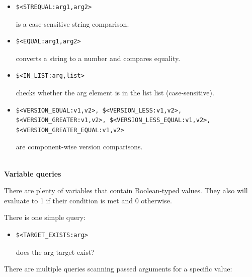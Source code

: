 \begin{itemize}
\item 
\begin{lstlisting}[style=styleCMake]
$<STREQUAL:arg1,arg2> 
\end{lstlisting}

is a case-sensitive string comparison.

\item 
\begin{lstlisting}[style=styleCMake]
$<EQUAL:arg1,arg2> 
\end{lstlisting}

converts a string to a number and compares equality.

\item 
\begin{lstlisting}[style=styleCMake]
$<IN_LIST:arg,list> 
\end{lstlisting}

checks whether the arg element is in the list list (case-sensitive).

\item 
\begin{lstlisting}[style=styleCMake]
$<VERSION_EQUAL:v1,v2>, $<VERSION_LESS:v1,v2>,
$<VERSION_GREATER:v1,v2>, $<VERSION_LESS_EQUAL:v1,v2>,
$<VERSION_GREATER_EQUAL:v1,v2> 
\end{lstlisting}
are component-wise version comparisons.
\end{itemize}

\hspace*{\fill} \\ %
\noindent
\textbf{Variable queries}

There are plenty of variables that contain Boolean-typed values. They also will evaluate to 1 if their condition is met and 0 otherwise.

There is one simple query:

\begin{itemize}
\item 
\begin{lstlisting}[style=styleCMake]
$<TARGET_EXISTS:arg> 
\end{lstlisting}
does the arg target exist?
\end{itemize}

There are multiple queries scanning passed arguments for a specific value:


